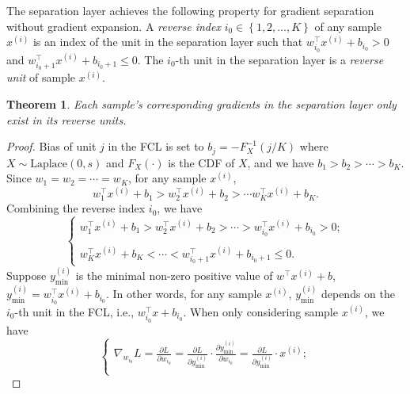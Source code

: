 \documentclass[lettersize,journal]{IEEEtran}
\newtheorem{theorem}{Theorem}
\begin{document}
The separation layer achieves the following property for gradient separation without gradient expansion. A \textit{reverse index} $i_0 \in \left\{1, 2, \dots, K\right\}$ of any sample $x^{\left(i\right)}$ is an index of the unit in the separation layer such that $w_{i_0}^\intercal x^{\left(i\right)} + b_{i_0} > 0 $ and $w_{i_0+1}^\intercal x^{\left(i\right)} + b_{i_0+1} \leq 0 $. The $i_0$-th unit in the separation layer is a \textit{reverse unit} of sample $x^{\left(i\right)}$.

\begin{theorem}
Each sample's corresponding gradients in the separation layer only exist in its reverse units.
\label{theorem-one-non-zero-gradients}
\end{theorem}

\begin{proof}
Bias of unit $j$ in the FCL is set to $b_j = - F^{-1}_X( j / K)$ where $X \sim \textrm{Laplace}(0,s)$ and $F_X(\cdot)$ is the CDF of $X$, and we have $b_1 > b_2 > \cdots > b_K$.
Since $w_1 = w_2 = \cdots = w_K$, for any sample $x^{\left(i\right)}$,
\begin{equation}
w_1^\intercal x^{\left(i\right)} + b_1 > w_2^\intercal x^{\left(i\right)} + b_2 > \cdots w_K^\intercal x^{\left(i\right)} + b_K.
\end{equation}
Combining the reverse index $i_0$, we have 
\begin{equation}
\left\{ \begin{matrix}
    w_1^\intercal x^{\left(i\right)} + b_1 > w_2^\intercal x^{\left(i\right)} + b_2 > \cdots > w_{i_0}^\intercal x^{\left(i\right)} + b_{i_0} > 0; \\ \\
    w_K^\intercal x^{\left(i\right)} + b_K < \cdots < w_{i_0+1}^\intercal x^{\left(i\right)} + b_{i_0+1} \leq 0.
\end{matrix}\right.
\end{equation}
Suppose $y^{\left(i\right)}_{\mathrm{min}}$ is the minimal non-zero positive value of $w^\intercal x^{\left(i\right)} + b$, $y^{\left(i\right)}_{\mathrm{min}} = w_{i_0}^\intercal x^{\left(i\right)} + b_{i_0}$. In other words, for any sample $x^{\left( i \right)}$, $y^{\left(i\right)}_{\mathrm{min}}$ depends on the $i_0$-th unit in the FCL, i.e., $w_{i_0}^\intercal x + b_{i_0}$. When only considering sample $x^{\left(i\right)}$, we have
\begin{equation}
\left\{ \begin{matrix}
    \nabla_{w_{i_0}}L = \frac{\partial L}{\partial w_{i_0}} = \frac{\partial L}{\partial y^{\left(i\right)}_{\mathrm{min}}} \cdot \frac{\partial y^{\left(i\right)}_{\mathrm{min}}}{\partial w_{i_0}} = \frac{\partial L}{\partial y^{\left(i\right)}_{\mathrm{min}}} \cdot x^{\left(i\right)}; \\

\end{matrix}
\end{equation}
\end{proof}
\end{document}

